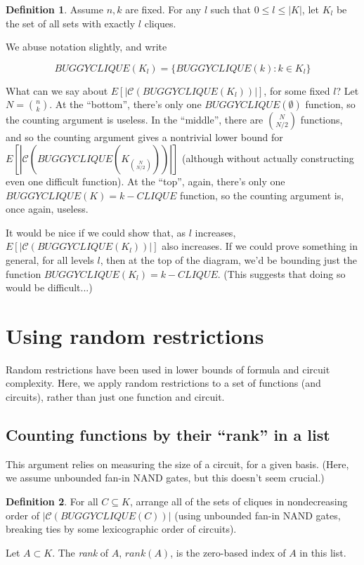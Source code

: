 \documentclass[12pt]{article}
\theoremstyle{definition}
\newtheorem{defn}{Definition}[section]
\newcommand{\bigC}[0]{\mathcal{C}}
\begin{document}
\begin{defn}
\label{CLIQUE-level}
Assume $n, k$ are fixed. For any $l$ such that
$0 \le l \le |K|$, let $K_l$ be the set of all sets
with exactly $l$ cliques. 
\end{defn}

We abuse notation slightly, and write

\[
BUGGYCLIQUE(K_l) = \{ BUGGYCLIQUE(k) : k \in K_l \}
\]

What can we say about $E[|\bigC(BUGGYCLIQUE(K_l))|]$, for
some fixed $l$? Let $N = {n \choose k}$.
At the ``bottom'', there's only one $BUGGYCLIQUE(\emptyset)$
function, so the counting argument is useless.
In the ``middle'',
there are ${N \choose {N/2}}$ functions, and so the counting
argument gives a nontrivial lower bound for
$E[|\bigC(BUGGYCLIQUE(K_{N \choose {N/2}}))|]$ (although
without actually constructing even one difficult function).
At the ``top'', again, there's only one $BUGGYCLIQUE(K) = k-CLIQUE$
function, so the counting argument is, once again, useless.

It would be nice if we could show that, as $l$ increases,
$E[|\bigC(BUGGYCLIQUE(K_l))|]$ also increases.
If we could prove something in general, for all levels $l$, then at
the top of the diagram, we'd be bounding just the function
$BUGGYCLIQUE(K_l) = k-CLIQUE$. (This suggests that doing so would
be difficult...)


\section{Using random restrictions}

Random restrictions have been used in lower bounds of formula
\cite{subbotovskaya1963comparison} and circuit \cite{hastad1987lower}
complexity.
Here, we apply random restrictions to a set of functions (and circuits),
rather than just one function and circuit.

\subsection{Counting functions by their ``rank'' in a list}

This argument relies on measuring the size of a circuit,
for a given basis. (Here, we assume unbounded fan-in
NAND gates, but this doesn't seem crucial.)

\begin{defn}
\label{Rank}
For all $C \subseteq K$,
arrange all of the sets of cliques in nondecreasing order
of $|\bigC(BUGGYCLIQUE(C))|$ (using unbounded fan-in NAND gates,
breaking ties by some lexicographic order of circuits).

Let $A \subset K$. The {\em rank} of $A$, $rank(A)$, is the zero-based
index of $A$ in this list.
\end{defn}
\end{document}
